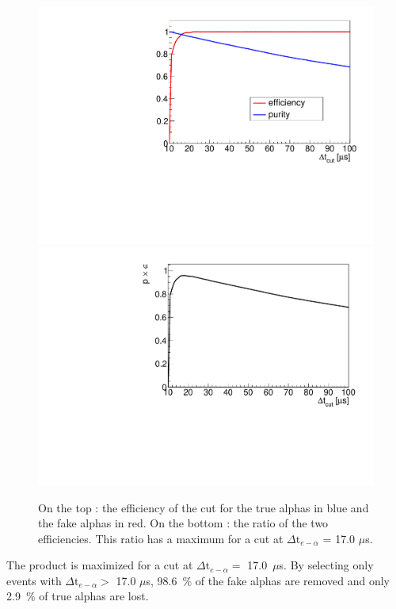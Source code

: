 \documentclass[main.tex]{subfiles}
\begin{document}
\begin{figure}[h!]
\begin{center}
\includegraphics[scale=0.4]{pictures/Chap5/efficiency_purity.pdf}
\includegraphics[scale=0.4]{pictures/Chap5/pe.pdf}
\caption{On the top : the efficiency of the cut for the true alphas in blue and the fake alphas in red. On the bottom : the ratio of the two efficiencies. This ratio has a maximum for a cut at $\Delta \text{t}_{e-\alpha}$ = 17.0 $\mu$s.}
\label{efficiency_ratio}
\end{center}
\end{figure}

\bigskip

\noindent The product is maximized for a cut at $\Delta \text{t}_{e-\alpha} =$ 17.0~$\mu$s. By selecting only events with $\Delta \text{t}_{e-\alpha} >$ 17.0 $\mu$s, 98.6~$\%$ of the fake alphas are removed and only 2.9~$\%$ of true alphas are lost.
\end{document}
